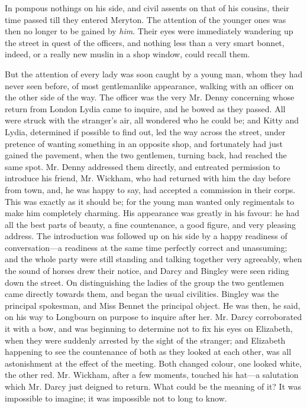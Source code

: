 \documentclass[12pt,openright]{book}
\begin{document}
In pompous nothings on his side, and civil assents on that of his cousins, their time passed till they entered Meryton. The attention of the younger ones was then no longer to be gained by \textit{him}. Their eyes were immediately wandering up the street in quest of the officers, and nothing less than a very smart bonnet, indeed, or a really new muslin in a shop window, could recall them.

But the attention of every lady was soon caught by a young man, whom they had never seen before, of most gentlemanlike appearance, walking with an officer on the other side of the way. The officer was the very Mr. Denny concerning whose return from London Lydia came to inquire, and he bowed as they passed. All were struck with the stranger’s air, all wondered who he could be; and Kitty and Lydia, determined if possible to find out, led the way across the street, under pretence of wanting something in an opposite shop, and fortunately had just gained the pavement, when the two gentlemen, turning back, had reached the same spot. Mr. Denny addressed them directly, and entreated permission to introduce his friend, Mr. Wickham, who had returned with him the day before from town, and, he was happy to say, had accepted a commission in their corps. This was exactly as it should be; for the young man wanted only regimentals to make him completely charming. His appearance was greatly in his favour: he had all the best parts of beauty, a fine countenance, a good figure, and very pleasing address. The introduction was followed up on his side by a happy readiness of conversation—a readiness at the same time perfectly correct and unassuming; and the whole party were still standing and talking together very agreeably, when the sound of horses drew their notice, and Darcy and Bingley were seen riding down the street. On distinguishing the ladies of the group the two gentlemen came directly towards them, and began the usual civilities. Bingley was the principal spokesman, and Miss Bennet the principal object. He was then, he said, on his way to Longbourn on purpose to inquire after her. Mr. Darcy corroborated it with a bow, and was beginning to determine not to fix his eyes on Elizabeth, when they were suddenly arrested by the sight of the stranger; and Elizabeth happening to see the countenance of both as they looked at each other, was all astonishment at the effect of the meeting. Both changed colour, one looked white, the other red. Mr. Wickham, after a few moments, touched his hat—a salutation which Mr. Darcy just deigned to return. What could be the meaning of it? It was impossible to imagine; it was impossible not to long to know.
\end{document}

